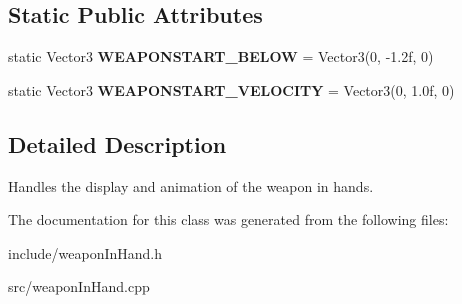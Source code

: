 \subsection*{\-Static \-Public \-Attributes}
\begin{DoxyCompactItemize}
\item 
\hypertarget{classWeaponInHand_ac4cbbcc5725fa7fd701b9a0b26b676a0}{
static \-Vector3 {\bfseries \-W\-E\-A\-P\-O\-N\-S\-T\-A\-R\-T\-\_\-\-B\-E\-L\-O\-W} = \-Vector3(0, -\/1.\-2f, 0)}
\label{dc/d08/classWeaponInHand_ac4cbbcc5725fa7fd701b9a0b26b676a0}

\item 
\hypertarget{classWeaponInHand_a2fc038a5c47878102bc1713ca9789988}{
static \-Vector3 {\bfseries \-W\-E\-A\-P\-O\-N\-S\-T\-A\-R\-T\-\_\-\-V\-E\-L\-O\-C\-I\-T\-Y} = \-Vector3(0, 1.\-0f, 0)}
\label{dc/d08/classWeaponInHand_a2fc038a5c47878102bc1713ca9789988}

\end{DoxyCompactItemize}


\subsection{\-Detailed \-Description}
\-Handles the display and animation of the weapon in hands. 

\-The documentation for this class was generated from the following files\-:\begin{DoxyCompactItemize}
\item 
include/weapon\-In\-Hand.\-h\item 
src/weapon\-In\-Hand.\-cpp\end{DoxyCompactItemize}
